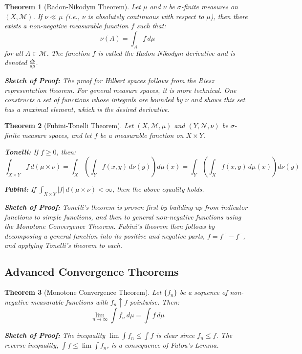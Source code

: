 \documentclass[12pt,a4paper]{article}
\newtheorem{theorem}{Theorem}[section]
\theoremstyle{remark}
\begin{document}
\begin{theorem}[Radon-Nikodym Theorem]
Let $\mu$ and $\nu$ be $\sigma$-finite measures on $(X, \mathcal{M})$. If $\nu \ll \mu$ (i.e., $\nu$ is absolutely continuous with respect to $\mu$), then there exists a non-negative measurable function $f$ such that:
$$\nu(A) = \int_A f \, d\mu$$
for all $A \in \mathcal{M}$. The function $f$ is called the Radon-Nikodym derivative and is denoted $\frac{d\nu}{d\mu}$.

\textbf{Sketch of Proof:} The proof for Hilbert spaces follows from the Riesz representation theorem. For general measure spaces, it is more technical. One constructs a set of functions whose integrals are bounded by $\nu$ and shows this set has a maximal element, which is the desired derivative.
\end{theorem}

\begin{theorem}[Fubini-Tonelli Theorem]
Let $(X, \mathcal{M}, \mu)$ and $(Y, \mathcal{N}, \nu)$ be $\sigma$-finite measure spaces, and let $f$ be a measurable function on $X \times Y$.

\textbf{Tonelli:} If $f \geq 0$, then:
$$\int_{X \times Y} f \, d(\mu \times \nu) = \int_X \left(\int_Y f(x,y) \, d\nu(y)\right) d\mu(x) = \int_Y \left(\int_X f(x,y) \, d\mu(x)\right) d\nu(y)$$

\textbf{Fubini:} If $\int_{X \times Y} |f| \, d(\mu \times \nu) < \infty$, then the above equality holds.

\textbf{Sketch of Proof:} Tonelli's theorem is proven first by building up from indicator functions to simple functions, and then to general non-negative functions using the Monotone Convergence Theorem. Fubini's theorem then follows by decomposing a general function into its positive and negative parts, $f = f^+ - f^-$, and applying Tonelli's theorem to each.
\end{theorem}

\subsection{Advanced Convergence Theorems}

\begin{theorem}[Monotone Convergence Theorem]
Let $\{f_n\}$ be a sequence of non-negative measurable functions with $f_n \uparrow f$ pointwise. Then:
$$\lim_{n \to \infty} \int f_n \, d\mu = \int f \, d\mu$$

\textbf{Sketch of Proof:} The inequality $\lim \int f_n \leq \int f$ is clear since $f_n \leq f$. The reverse inequality, $\int f \leq \lim \int f_n$, is a consequence of Fatou's Lemma.
\end{theorem}
\end{document}
